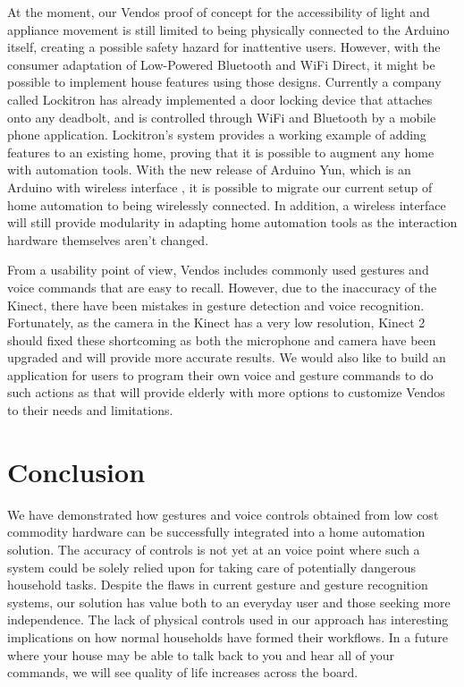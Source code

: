 \documentclass{chi-ext}
\begin{document}
At the moment, our Vendos proof of concept for the accessibility of light and appliance movement is still limited to being physically connected to the Arduino itself, creating a possible safety hazard for inattentive users.
However, with the consumer adaptation of Low-Powered Bluetooth and WiFi Direct, it might be possible to implement house features using those designs.
Currently a company called Lockitron has already implemented a door locking device that attaches onto any deadbolt, and is controlled through WiFi and Bluetooth by a mobile phone application\cite{_lockitron}.
Lockitron's system provides a working example of adding features to an existing home, proving that it is possible to augment any home with automation tools.
With the new release of Arduino Yun, which is an Arduino with wireless interface \cite{_arduino_yun}, it is possible to migrate our current setup of home automation to being wirelessly connected.
In addition, a wireless interface will still provide modularity in adapting home automation tools as the interaction hardware themselves aren't changed. 

From a usability point of view, Vendos includes commonly used gestures and voice commands that are easy to recall.
However, due to the inaccuracy of the Kinect, there have been mistakes in gesture detection and voice recognition.
Fortunately, as the camera in the Kinect has a very low resolution, Kinect 2 should fixed these shortcoming as both the microphone and camera have been upgraded and will provide more accurate results.
We would also like to build an application for users to program their own voice and gesture commands to do such actions as that will provide elderly with more options to customize Vendos to their needs and limitations.

\section{Conclusion}

We have demonstrated how gestures and voice controls obtained from low cost commodity hardware can be successfully integrated into a home automation solution.
The accuracy of controls is not yet at an voice point where such a system could be solely relied upon for taking care of potentially dangerous household tasks.
Despite the flaws in current gesture and gesture recognition systems, our solution has value both to an everyday user and those seeking more independence.
The lack of physical controls used in our approach has interesting implications on how normal households have formed their workflows.
In a future where your house may be able to talk back to you and hear all of your commands, we will see quality of life increases across the board.
\end{document}
